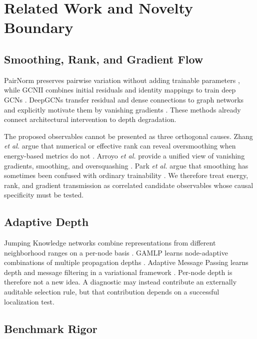 \documentclass[journal]{IEEEtran}
\begin{document}
\section{Related Work and Novelty Boundary}

\subsection{Smoothing, Rank, and Gradient Flow}

PairNorm preserves pairwise variation without adding trainable parameters \cite{zhao2019pairnorm}, while GCNII combines initial residuals and identity mappings to train deep GCNs \cite{chen2020gcnii}. DeepGCNs transfer residual and dense connections to graph networks and explicitly motivate them by vanishing gradients \cite{li2019deepgcns}. These methods already connect architectural intervention to depth degradation.

The proposed observables cannot be presented as three orthogonal causes. Zhang \emph{et al.} argue that numerical or effective rank can reveal oversmoothing when energy-based metrics do not \cite{zhang2026rank}. Arroyo \emph{et al.} provide a unified view of vanishing gradients, smoothing, and oversquashing \cite{arroyo2025bridging}. Park \emph{et al.} argue that smoothing has sometimes been confused with ordinary trainability \cite{park2025fallacy}. We therefore treat energy, rank, and gradient transmission as correlated candidate observables whose causal specificity must be tested.

\subsection{Adaptive Depth}

Jumping Knowledge networks combine representations from different neighborhood ranges on a per-node basis \cite{xu2018jk}. GAMLP learns node-adaptive combinations of multiple propagation depths \cite{zhang2022gamlp}. Adaptive Message Passing learns depth and message filtering in a variational framework \cite{errica2025amp}. Per-node depth is therefore not a new idea. A diagnostic may instead contribute an externally auditable selection rule, but that contribution depends on a successful localization test.

\subsection{Benchmark Rigor}
\end{document}
